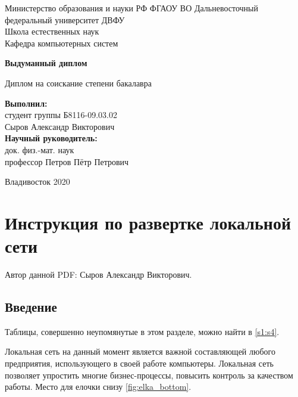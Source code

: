 \documentclass{article}
\author{Сыров Александр Викторович}
\begin{document}
	
\begin{titlepage}
	\begin{center}
		Министерство образования и науки РФ
		ФГАОУ ВО Дальневосточный федеральный университет \flqq ДВФУ\frqq\\
		Школа естественных наук\\
		Кафедра компьютерных систем\\
	\end{center}
	\vspace{5cm}
	\begin{center}
		\LARGE \bf{Выдуманный диплом}
	\end{center}
	\begin{center}\large
		Диплом на соискание степени бакалавра
	\end{center}
	\vspace{3cm}
	\large
	\begin{flushright}
		\textbf{Выполнил:}\\
		студент группы Б8116-09.03.02\\
		Сыров Александр Викторович\\
		\vspace{1cm}
		\textbf{Научный руководитель:}\\
		док. физ.-мат. наук \\
		профессор Петров Пётр Петрович
	\end{flushright}
	\vspace{1cm}
	\begin{center}
		Владивосток 2020
	\end{center}
\end{titlepage}

\section{Инструкция по развертке локальной сети} \label{s1}

Автор данной PDF: Сыров Александр Викторович.

\subsection{Введение} \label{s1:s1}

Таблицы, совершенно неупомянутые в этом разделе, можно найти в \ref{s1:s4}.

Локальная сеть на данный момент является важной составляющей любого предприятия, использующего в своей работе компьютеры. Локальная сеть позволяет упростить многие бизнес-процессы, повысить контроль за качеством работы. Место для елочки снизу \ref{fig:elka_bottom}.
\end{document}
